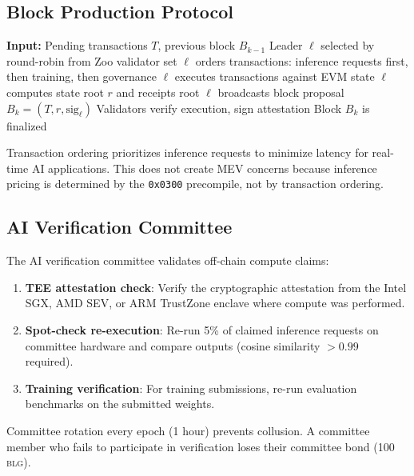 \documentclass[11pt,letterpaper]{article}
\newcommand{\BLG}{\textsc{blg}}
\begin{document}
\subsection{Block Production Protocol}

\begin{algorithm}
\caption{Beluga block production}
\label{alg:block}
\begin{algorithmic}[1]
\STATE \textbf{Input:} Pending transactions $T$, previous block $B_{k-1}$
\STATE Leader $\ell$ selected by round-robin from Zoo validator set
\STATE $\ell$ orders transactions: inference requests first, then training, then governance
\STATE $\ell$ executes transactions against EVM state
\STATE $\ell$ computes state root $r$ and receipts root
\STATE $\ell$ broadcasts block proposal $B_k = (T, r, \text{sig}_\ell)$
\STATE Validators verify execution, sign attestation
    \STATE Block $B_k$ is finalized
\ENDIF
\end{algorithmic}
\end{algorithm}

Transaction ordering prioritizes inference requests to minimize latency for real-time AI applications. This does not create MEV concerns because inference pricing is determined by the \texttt{0x0300} precompile, not by transaction ordering.

\subsection{AI Verification Committee}

The AI verification committee validates off-chain compute claims:

\begin{enumerate}[nosep]
    \item \textbf{TEE attestation check}: Verify the cryptographic attestation from the Intel SGX, AMD SEV, or ARM TrustZone enclave where compute was performed.
    \item \textbf{Spot-check re-execution}: Re-run 5\% of claimed inference requests on committee hardware and compare outputs (cosine similarity $> 0.99$ required).
    \item \textbf{Training verification}: For training submissions, re-run evaluation benchmarks on the submitted weights.
\end{enumerate}

Committee rotation every epoch (1 hour) prevents collusion. A committee member who fails to participate in verification loses their committee bond (100 \BLG{}).
\end{document}
